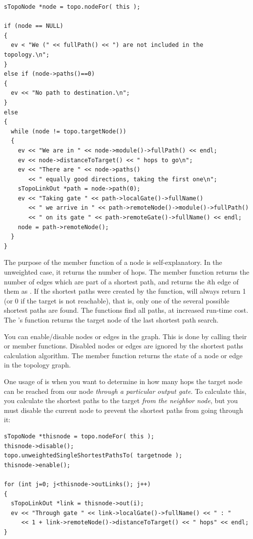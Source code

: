 \begin{verbatim}
sTopoNode *node = topo.nodeFor( this );

if (node == NULL)
{
  ev < "We (" << fullPath() << ") are not included in the topology.\n";
}
else if (node->paths()==0)
{
  ev << "No path to destination.\n";
}
else
{
  while (node != topo.targetNode())
  {
    ev << "We are in " << node->module()->fullPath() << endl;
    ev << node->distanceToTarget() << " hops to go\n";
    ev << "There are " << node->paths()
       << " equally good directions, taking the first one\n";
    sTopoLinkOut *path = node->path(0);
    ev << "Taking gate " << path->localGate()->fullName()
       << " we arrive in " << path->remoteNode()->module()->fullPath()
       << " on its gate " << path->remoteGate()->fullName() << endl;
    node = path->remoteNode();
  }
}
\end{verbatim}


The purpose of the  member function of a
node is self-explanatory. In the unweighted case, it returns the
number of hops. The  member function returns the number
of edges which are part of a shortest path, and
 returns the \textit{i}th edge of them as
. If the shortest paths were created by the
 function,
 will always return 1 (or 0 if the target is not
reachable), that is, only one of the several possible shortest paths
are found.  The
 functions
find all paths, at increased run-time cost. The 's
 function returns the target node of the last
shortest path search.

You can enable/disable nodes or edges in the graph. This is done by
calling their  or  member functions.
Disabled nodes or edges are ignored by the shortest paths calculation
algorithm. The  member function returns the state of
a node or edge in the topology graph.

One usage of  is when you want to determine in how many
hops the target node can be reached from our node \textit{through
a particular output gate}. To calculate this, you calculate the
shortest paths to the target \textit{from the neighbor node}, but
you must disable the current node to prevent the shortest paths
from going through it:

\begin{verbatim}
sTopoNode *thisnode = topo.nodeFor( this );
thisnode->disable();
topo.unweightedSingleShortestPathsTo( targetnode );
thisnode->enable();

for (int j=0; j<thisnode->outLinks(); j++)
{
  sTopoLinkOut *link = thisnode->out(i);
  ev << "Through gate " << link->localGate()->fullName() << " : "
     << 1 + link->remoteNode()->distanceToTarget() << " hops" << endl;
}
\end{verbatim}

